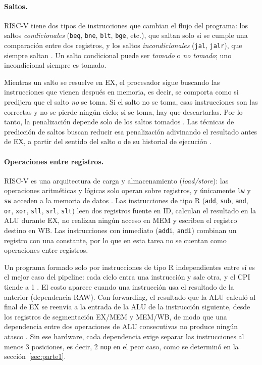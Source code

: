 \documentclass[11pt,a4paper]{article}
\begin{document}
\paragraph{Saltos.}
RISC-V tiene dos tipos de instrucciones que cambian el flujo del programa: los
saltos \emph{condicionales} (\texttt{beq}, \texttt{bne}, \texttt{blt},
\texttt{bge}, etc.), que saltan solo si se cumple una comparaci\'on entre dos
registros, y los saltos \emph{incondicionales} (\texttt{jal}, \texttt{jalr}),
que siempre saltan \cite{harris,patterson}. Un salto condicional puede ser
\emph{tomado} o \emph{no tomado}; uno incondicional siempre es tomado.
 
Mientras un salto se resuelve en EX, el procesador sigue buscando las
instrucciones que vienen despu\'es en memoria, es decir, se comporta como si
predijera que el salto \emph{no} se toma. Si el salto no se toma, esas
instrucciones son las correctas y no se pierde ning\'un ciclo; si se toma, hay
que descartarlas. Por lo tanto, la penalizaci\'on depende solo de los saltos
tomados \cite{patterson}. Las t\'ecnicas de predicci\'on de saltos buscan
reducir esa penalizaci\'on adivinando el resultado antes de EX, a partir del
sentido del salto o de su historial de ejecuci\'on \cite{smith}.

\paragraph{Operaciones entre registros.}
RISC-V es una arquitectura de carga y almacenamiento (\emph{load/store}): las
operaciones aritm\'eticas y l\'ogicas solo operan sobre registros, y \'unicamente
\texttt{lw} y \texttt{sw} acceden a la memoria de datos
\cite{harris,patterson,riscv}. Las instrucciones de tipo R (\texttt{add},
\texttt{sub}, \texttt{and}, \texttt{or}, \texttt{xor}, \texttt{sll},
\texttt{srl}, \texttt{slt}) leen dos registros fuente en ID, calculan el
resultado en la ALU durante EX, no realizan ning\'un acceso en MEM y escriben el
registro destino en WB. Las instrucciones con inmediato (\texttt{addi},
\texttt{andi}) combinan un registro con una constante, por lo que en esta tarea
no se cuentan como operaciones entre registros.

Un programa formado solo por instrucciones de tipo R independientes entre s\'i es
el mejor caso del pipeline: cada ciclo entra una instrucci\'on y sale otra, y el
CPI tiende a 1 \cite{patterson}. El costo aparece cuando una instrucci\'on usa el
resultado de la anterior (dependencia RAW). Con forwarding, el resultado que la
ALU calcul\'o al final de EX se reenv\'ia a la entrada de la ALU de la instrucci\'on
siguiente, desde los registros de segmentaci\'on EX/MEM y MEM/WB, de modo que una
dependencia entre dos operaciones de ALU consecutivas no produce ning\'un atasco
\cite{harris,patterson}. Sin ese hardware, cada dependencia exige separar las
instrucciones al menos 3 posiciones, es decir, 2 \texttt{nop} en el peor caso,
como se determin\'o en la secci\'on~\ref{sec:parte1}.
\end{document}
